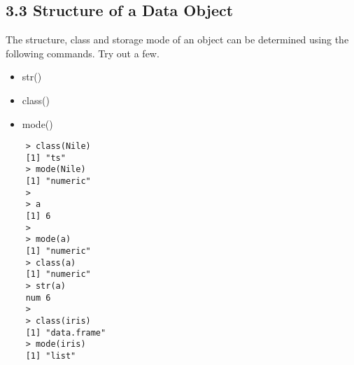 \subsection{3.3 Structure of a Data Object}
The structure, class and storage mode of an object can be determined using the following
commands. Try out a few.
\begin{itemize}
	\item str()
	\item class()
	\item mode()
\end{itemize}
\begin{framed}
	\begin{verbatim}
	> class(Nile)
	[1] "ts"
	> mode(Nile)
	[1] "numeric"
	>
	> a
	[1] 6
	>
	> mode(a)
	[1] "numeric"
	> class(a)
	[1] "numeric"
	> str(a)
	num 6
	>
	> class(iris)
	[1] "data.frame"
	> mode(iris)
	[1] "list"
	\end{verbatim}
\end{framed}
